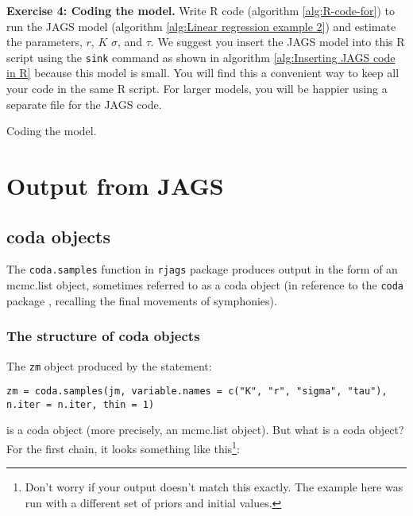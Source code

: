 \documentclass[12pt,english]{article}
\begin{document}
\belowcaptionskip=-20pt
\begin{exercise}
\begin{mdframed}
\doublespacing
\textbf{Exercise 4: Coding the model.} Write R code (algorithm \ref{alg:R-code-for}) to run the JAGS model (algorithm \ref{alg:Linear regression example 2}) and estimate the parameters, $r$, $K$ $\sigma$, and $\tau$. We suggest you insert the JAGS model into this R script using the \texttt{sink} command as shown in algorithm \ref{alg:Inserting JAGS code in R} because this model is small. You will find this a convenient way to keep all your code in the same R script. For larger models, you will be happier using a separate file for the JAGS code.
\end{mdframed}
\captionsetup{textformat=empty, labelformat=empty}
\caption[Coding the model]{Coding the model.}
\label{ex:logistic regression sequential}
\end{exercise}
\belowcaptionskip=0pt


\section{Output from JAGS}

\subsection{coda objects}

The \texttt{coda.samples} function in \texttt{rjags} package produces output in the form of an mcmc.list object, sometimes referred to as a coda object (in reference to the \texttt{coda} package \citep{Plummer2016coda}, recalling the final movements of symphonies). 


\subsubsection{The structure of coda objects}

The \texttt{zm} object produced by the statement:

\begin{Verbatim}
zm = coda.samples(jm, variable.names = c("K", "r", "sigma", "tau"), 
n.iter = n.iter, thin = 1)
\end{Verbatim}

\noindent is a coda object (more precisely, an mcmc.list object). But what is a coda object? For the first chain, it looks something like this\footnote{Don't worry if your output doesn't match this exactly. The example here was run with a different set of priors and initial values.}:
\end{document}
